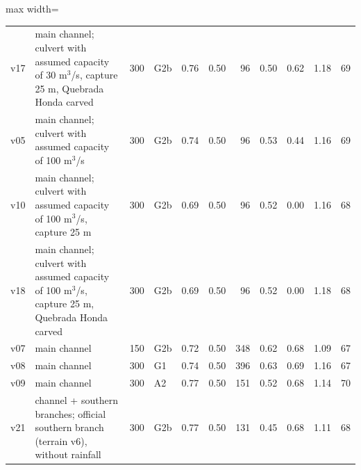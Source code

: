 \begin{table}[htbp]
{\begin{adjustbox}{max width=\textwidth}
\begin{tabular}{llrlrrrrrrr}
v17 & main channel; culvert with assumed capacity of 30 m$^3$/s, capture 25 m, Quebrada Honda carved & 300 & G2b & 0.76 & 0.50 & 96 & 0.50 & 0.62 & 1.18 & 69\\
v05 & main channel; culvert with assumed capacity of 100 m$^3$/s & 300 & G2b & 0.74 & 0.50 & 96 & 0.53 & 0.44 & 1.16 & 69\\
v10 & main channel; culvert with assumed capacity of 100 m$^3$/s, capture 25 m & 300 & G2b & 0.69 & 0.50 & 96 & 0.52 & 0.00 & 1.16 & 68\\
v18 & main channel; culvert with assumed capacity of 100 m$^3$/s, capture 25 m, Quebrada Honda carved & 300 & G2b & 0.69 & 0.50 & 96 & 0.52 & 0.00 & 1.18 & 68\\
v07 & main channel & 150 & G2b & 0.72 & 0.50 & 348 & 0.62 & 0.68 & 1.09 & 67\\
v08 & main channel & 300 & G1 & 0.74 & 0.50 & 396 & 0.63 & 0.69 & 1.16 & 67\\
v09 & main channel & 300 & A2 & 0.77 & 0.50 & 151 & 0.52 & 0.68 & 1.14 & 70\\
v21 & channel + southern branches; official southern branch (terrain v6), without rainfall & 300 & G2b & 0.77 & 0.50 & 131 & 0.45 & 0.68 & 1.11 & 68\\
\bottomrule\end{tabular}\end{adjustbox}}
\end{table}
